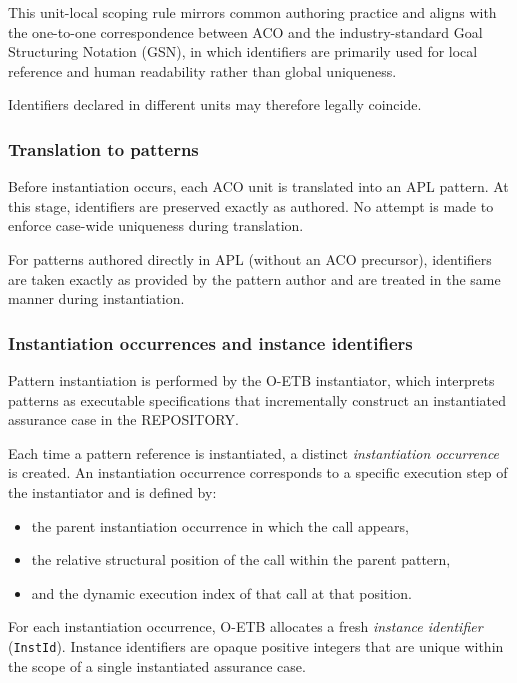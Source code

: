 \documentclass[12pt,twoside,a4paper]{article}
\begin{document}
This unit-local scoping rule mirrors common authoring practice and aligns with the one-to-one correspondence between ACO and the industry-standard Goal Structuring Notation (GSN), in which identifiers are primarily used for local reference and human readability rather than global uniqueness.

Identifiers declared in different units may therefore legally coincide.

\subsubsection{Translation to patterns}
\label{sec:aco-translation-patterns}

Before instantiation occurs, each ACO unit is translated into an APL pattern. At this stage, identifiers are preserved exactly as authored. No attempt is made to enforce case-wide uniqueness during translation.

For patterns authored directly in APL (without an ACO precursor), identifiers are taken exactly as provided by the pattern author and are treated in the same manner during instantiation.

\subsubsection{Instantiation occurrences and instance identifiers}
\label{sec:aco-instantiation-occurrences}

Pattern instantiation is performed by the O-ETB instantiator, which interprets patterns as executable specifications that incrementally construct an instantiated assurance case in the REPOSITORY.

Each time a pattern reference is instantiated, a distinct \emph{instantiation occurrence} is created. An instantiation occurrence corresponds to a specific execution step of the instantiator and is defined by:
\begin{itemize}
  \item the parent instantiation occurrence in which the call appears,
  \item the relative structural position of the call within the parent pattern,
  \item and the dynamic execution index of that call at that position.
\end{itemize}

For each instantiation occurrence, O-ETB allocates a fresh \emph{instance identifier} (\texttt{InstId}). Instance identifiers are opaque positive integers that are unique within the scope of a single instantiated assurance case.
\end{document}
